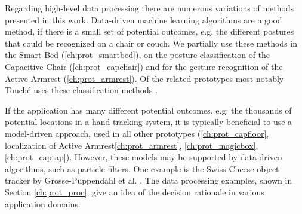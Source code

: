 Regarding high-level data processing there are numerous variations of methods presented in this work. Data-driven machine learning algorithms are a good method, if there is a small set of potential outcomes, e.g. the different postures that could be recognized on a chair or couch. We partially use these methods in the Smart Bed (\ref{ch:prot_smartbed}), on the posture classification of the Capacitive Chair (\ref{ch:prot_capchair}) and for the gesture recognition of the Active Armrest (\ref{ch:prot_armrest}). Of the related prototypes most notably Touché uses these classification methods \cite{Sato2012}. 

If the application has many different potential outcomes, e.g. the thousands of potential locations in a hand tracking system, it is typically beneficial to use a model-driven approach, used in all other prototypes (\ref{ch:prot_capfloor}, localization of Active Armrest\ref{ch:prot_armrest}, \ref{ch:prot_magicbox}, \ref{ch:prot_captap}). However, these models may be supported by data-driven algorithms, such as particle filters. One example is the Swiss-Cheese object tracker by Grosse-Puppendahl et al. \cite{grosse2013swiss}. The data processing examples, shown in Section \ref{ch:prot_proc}, give an idea of the decision rationale in various application domains. 


